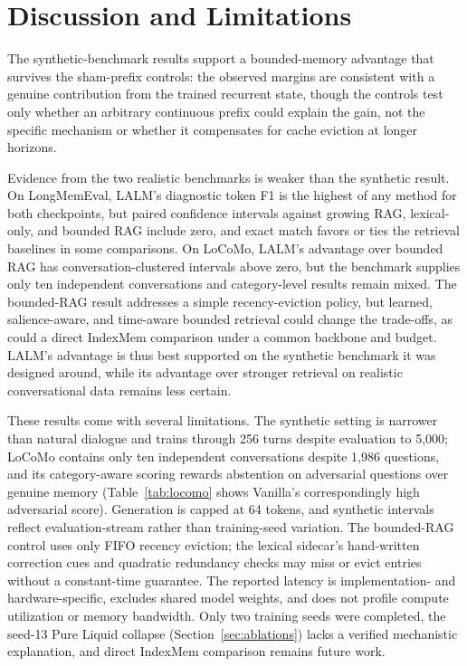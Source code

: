 \documentclass[conference]{IEEEtran}
\begin{document}
\section{Discussion and Limitations}
The synthetic-benchmark results support a bounded-memory advantage that survives the sham-prefix controls: the observed margins are consistent with a genuine contribution from the trained recurrent state, though the controls test only whether an arbitrary continuous prefix could explain the gain, not the specific mechanism or whether it compensates for cache eviction at longer horizons.

Evidence from the two realistic benchmarks is weaker than the synthetic result. On LongMemEval, LALM's diagnostic token F1 is the highest of any method for both checkpoints, but paired confidence intervals against growing RAG, lexical-only, and bounded RAG include zero, and exact match favors or ties the retrieval baselines in some comparisons. On LoCoMo, LALM's advantage over bounded RAG has conversation-clustered intervals above zero, but the benchmark supplies only ten independent conversations and category-level results remain mixed. The bounded-RAG result addresses a simple recency-eviction policy, but learned, salience-aware, and time-aware bounded retrieval could change the trade-offs, as could a direct IndexMem comparison under a common backbone and budget. LALM's advantage is thus best supported on the synthetic benchmark it was designed around, while its advantage over stronger retrieval on realistic conversational data remains less certain.

These results come with several limitations. The synthetic setting is narrower than natural dialogue and trains through 256 turns despite evaluation to 5,000; LoCoMo contains only ten independent conversations despite 1,986 questions, and its category-aware scoring rewards abstention on adversarial questions over genuine memory (Table~\ref{tab:locomo} shows Vanilla's correspondingly high adversarial score). Generation is capped at 64 tokens, and synthetic intervals reflect evaluation-stream rather than training-seed variation. The bounded-RAG control uses only FIFO recency eviction; the lexical sidecar's hand-written correction cues and quadratic redundancy checks may miss or evict entries without a constant-time guarantee. The reported latency is implementation- and hardware-specific, excludes shared model weights, and does not profile compute utilization or memory bandwidth. Only two training seeds were completed, the seed-13 Pure Liquid collapse (Section~\ref{sec:ablations}) lacks a verified mechanistic explanation, and direct IndexMem comparison remains future work.
\end{document}
